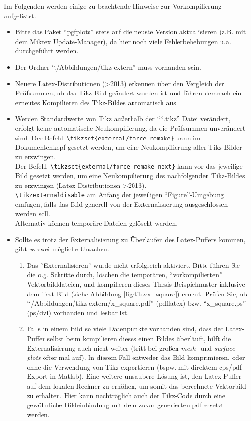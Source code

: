 \vspace{\baselineskip}
Im Folgenden werden einige zu beachtende Hinweise zur Vorkompilierung aufgelistet:
\begin{itemize}
	\item Bitte das Paket "`pgfplots"' stets auf die neuste Version aktualisieren (z.B. mit dem Miktex Update-Manager), da hier noch viele Fehlerbehebungen u.a. durchgeführt werden.
	\item Der Ordner "`./Abbildungen/tikz-extern"' muss vorhanden sein.
	\item Neuere Latex-Distributionen (>2013) erkennen über den Vergleich der Prüfsummen, ob das Tikz-Bild geändert worden ist und führen demnach ein erneutes Kompilieren des Tikz-Bildes automatisch aus.
	\item Werden Standardwerte von Tikz außerhalb der "`*.tikz"' Datei verändert, erfolgt keine automatische Neukompilierung, da die Prüfsummen unverändert sind.
	Der Befehl\texttt{ \textbackslash tikzset\{external/force remake\}} kann im Dokumentenkopf gesetzt werden, um eine Neukompilierung aller Tikz-Bilder zu erzwingen.\\
	Der Befehl\texttt{ \textbackslash tikzset\{external/force remake next\}} kann vor das jeweilige Bild gesetzt werden, um eine Neukompilierung des nachfolgenden Tikz-Bildes zu erzwingen (Latex Distributionen >2013).\\
	\texttt{\textbackslash tikzexternaldisable} am Anfang der jeweiligen "`Figure"'-Umgebung einfügen, falls das Bild generell von der Externalisierung ausgeschlossen werden soll.\\
	Alternativ können temporäre Dateien gelöscht werden.
	\item Sollte es trotz der Externalisierung zu Überläufen des Latex-Puffers kommen, gibt es zwei mögliche Ursachen.
	\begin{enumerate}
		\item Das "`Externalisieren"' wurde nicht erfolgreich aktiviert. Bitte führen Sie die o.g. Schritte durch, löschen die temporären, "`vorkompilierten"' Vektorbilddateien, und kompilieren dieses Thesis-Beispielmuster inklusive dem Test-Bild (siehe Abbildung \ref{fig:tikz:x_square}) erneut. Prüfen Sie, ob "`./Abbildungen/tikz-extern/x\_square.pdf"' (pdflatex) bzw. "`x\_square.ps"' (ps/dvi) vorhanden und lesbar ist.
		\item Falls in einem Bild so viele Datenpunkte vorhanden sind, dass der Latex-Puffer selbst beim kompilieren dieses einen Bildes überläuft, hilft die Externalisierung auch nicht weiter (tritt bei großen \textit{mesh-} und \textit{surface-plots} öfter mal auf). In diesem Fall entweder das Bild komprimieren, oder ohne die Verwendung von Tikz exportieren (bspw. mit direktem eps/pdf-Export in Matlab).
		Eine weitere unsaubere Lösung ist, den Latex-Puffer auf dem lokalen Rechner zu erhöhen, um somit das berechnete Vektorbild zu erhalten. Hier kann nachträglich auch der Tikz-Code durch eine gewöhnliche Bildeinbindung mit dem zuvor generierten pdf ersetzt werden.
	\end{enumerate}
	
\end{itemize}



